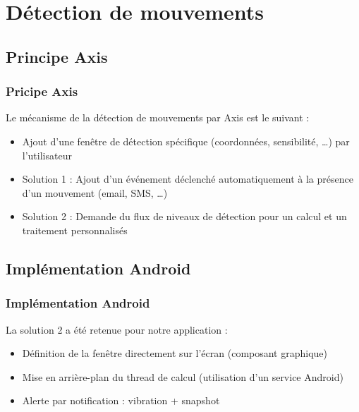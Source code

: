\documentclass{beamer}
\begin{document}
\section{Détection de mouvements}
\subsection{Principe Axis}
 \begin{frame}
   \frametitle{Pricipe Axis}
    Le mécanisme de la détection de mouvements par Axis est le suivant :
   \begin{itemize}
    \item Ajout d'une fenêtre de détection spécifique (coordonnées,
    sensibilité, \ldots) par l'utilisateur
    \item Solution 1 : Ajout d'un événement déclenché automatiquement à la
    présence d'un mouvement (email, SMS, \ldots)
    \item Solution 2 : Demande du flux de niveaux de détection pour un
    calcul et un traitement personnalisés
   \end{itemize}
\end{frame}

\subsection{Implémentation Android}
 \begin{frame}
   \frametitle{Implémentation Android}
    La solution 2 a été retenue pour notre application :
    \begin{itemize}
    \item Définition de la fenêtre directement sur l'écran (composant
    graphique)
    \item Mise en arrière-plan du thread de calcul (utilisation d'un service
    Android)
    \item Alerte par notification : vibration + snapshot
   \end{itemize}
\end{frame}











\end{document}
